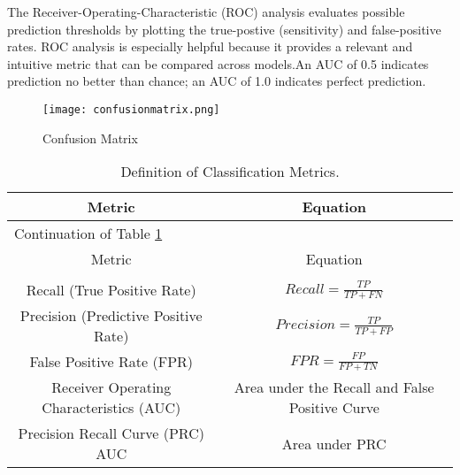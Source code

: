 The Receiver-Operating-Characteristic (ROC) analysis evaluates possible prediction thresholds by plotting the true-postive (sensitivity) and false-positive rates. ROC analysis is especially helpful because it provides a relevant and intuitive metric that can be compared across models.An AUC of 0.5 indicates prediction no better than chance; an AUC of 1.0 indicates perfect prediction.

\begin{figure}[h]
\centering
\texttt{[image: confusionmatrix.png]}
\caption{Confusion Matrix}
\end{figure}

 \begin{longtable}[c]{| c | c |}

 
 \hline
 Metric & Equation\\
 \hline
 \endfirsthead

 \hline
 \multicolumn{2}{|l|}{Continuation of Table \ref{long}}\\
 \hline
 Metric & Equation\\
 \hline
 \endhead

 \hline
 \caption{Definition of Classification Metrics.\label{long}}\\
 \endlastfoot

Recall (True Positive Rate)  & $Recall = \frac{TP}{TP + FN}$ \\
 \hline
Precision (Predictive Positive Rate) & $Precision = \frac{TP}{TP + FP}$ \\
 \hline
False Positive Rate (FPR)  & $FPR = \frac{FP}{FP + TN}$ \\
 \hline
Receiver Operating Characteristics (AUC) 
& Area under the Recall and False Positive Curve \\ 
 \hline
Precision Recall Curve (PRC) AUC & Area under PRC \\
 \end{longtable}
